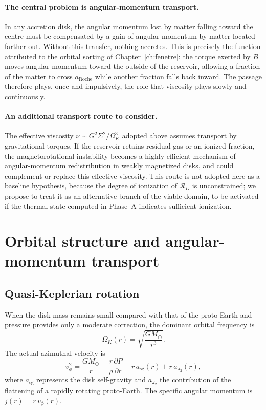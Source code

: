\documentclass[11pt,a4paper,openany]{report}
\newcommand{\Mt}{M_{\oplus}}
\newcommand{\aR}{a_{\mathrm{Roche}}}
\newcommand{\RD}{\mathcal{R}_{D}}
\begin{document}
\paragraph{The central problem is angular-momentum transport.} In any accretion disk, the angular
momentum lost by matter falling toward the centre must be compensated by a gain of angular momentum
by matter located farther out. Without this transfer, nothing accretes. This is precisely the
function attributed to the orbital sorting of Chapter~\ref{ch:fenetre}: the torque exerted by $B$
moves angular momentum toward the outside of the reservoir, allowing a fraction of the matter to
cross $\aR$ while another fraction falls back inward. The passage therefore plays, once and
impulsively, the role that viscosity plays slowly and continuously.

\paragraph{An additional transport route to consider.} The effective viscosity
$\nu\sim G^2\Sigma^2/\Omega_K^3$ adopted above assumes transport by gravitational torques. If the
reservoir retains residual gas or an ionized fraction, the magnetorotational instability
\cite{BalbusHawley1991} becomes a highly efficient mechanism of angular-momentum redistribution in
weakly magnetized disks, and could complement or replace this effective viscosity. This route is not
adopted here as a baseline hypothesis, because the degree of ionization of $\RD$ is unconstrained;
we propose to treat it as an alternative branch of the viable domain, to be activated if the thermal
state computed in Phase~A indicates sufficient ionization.

\section{Orbital structure and angular-momentum transport}
\subsection{Quasi-Keplerian rotation}

When the disk mass remains small compared with that of the proto-Earth and pressure provides only
a moderate correction, the dominant orbital frequency is
\begin{equation}
\Omega_K(r)=\sqrt{\frac{G\Mt}{r^3}}.
\label{eq:OmegaK}
\end{equation}
The actual azimuthal velocity is
\begin{equation}
v_\phi^2=\frac{G\Mt}{r}+\frac{r}{\rho}\frac{\partial P}{\partial r}+r\,a_{\mathrm{sg}}(r)
+r\,a_{J_2}(r),
\label{eq:vphi}
\end{equation}
where $a_{\mathrm{sg}}$ represents the disk self-gravity and $a_{J_2}$ the contribution of the
flattening of a rapidly rotating proto-Earth. The specific angular momentum is $j(r)=r\,v_\phi(r)$.
\end{document}
